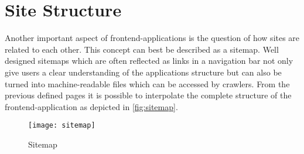 \section{Site Structure}
Another important aspect of frontend-applications is the question of how sites are related to each other. This concept can best be described as a sitemap. Well designed sitemaps which are often reflected as links in a navigation bar not only give users a clear understanding of the applications structure but can also be turned into machine-readable files which can be accessed by crawlers. From the previous defined pages it is possible to interpolate the complete structure of the frontend-application as depicted in \autoref{fig:sitemap}. \newline

\begin{figure}[H]
    \begin{center}
    \texttt{[image: sitemap]}
    \end{center}
    \caption{Sitemap}
    \label{fig:sitemap}
\end{figure}